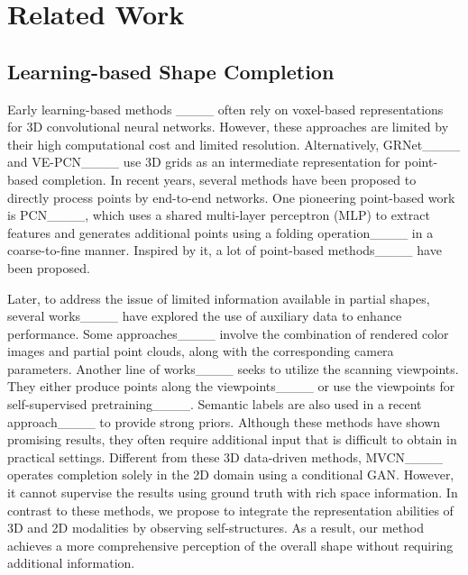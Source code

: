 \section{Related Work}
\subsection{Learning-based Shape Completion}
Early learning-based methods ____ often rely on voxel-based representations for 3D convolutional neural networks. However, these approaches are limited by their high computational cost and limited resolution. Alternatively, GRNet____ and VE-PCN____ use 3D grids as an intermediate representation for point-based completion.  
In recent years, several methods have been proposed to directly process points by end-to-end networks. One pioneering point-based work is PCN____, which uses a shared multi-layer perceptron (MLP) to extract features and generates additional points using a folding operation____ in a coarse-to-fine manner. Inspired by it, a lot of point-based methods____ have been proposed.

Later, to address the issue of limited information available in partial shapes, several works____ have explored the use of auxiliary data to enhance performance. 
Some approaches____ involve the combination of rendered color images and partial point clouds, along with the corresponding camera parameters.
Another line of works____ seeks to utilize the scanning viewpoints. They either produce points along the viewpoints____ or use the viewpoints for self-supervised pretraining____.
Semantic labels are also used in a recent approach____ to provide strong priors.
Although these methods have shown promising results, they often require additional input that is difficult to obtain in practical settings. 
Different from these 3D data-driven methods, MVCN____ operates completion solely in the 2D domain using a conditional GAN. However, it cannot supervise the results using ground truth with rich space information. 
In contrast to these methods, we propose to integrate the representation abilities of 3D and 2D modalities by observing self-structures. As a result, our method achieves a more comprehensive perception of the overall shape without requiring additional information.

